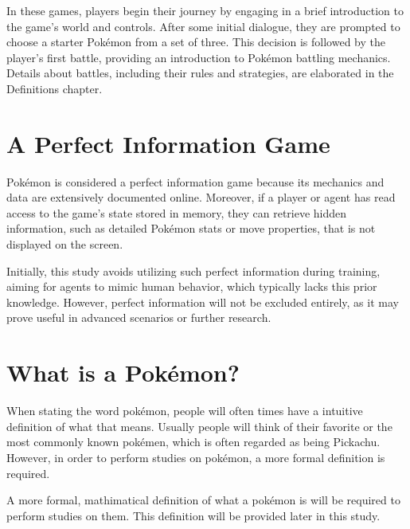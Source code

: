 In these games, players begin their journey by engaging in a brief introduction to the game’s world and controls. After some initial dialogue, they are prompted to choose a starter Pokémon from a set of three. This decision is followed by the player’s first battle, providing an introduction to Pokémon battling mechanics. Details about battles, including their rules and strategies, are elaborated in the Definitions chapter.

\section{A Perfect Information Game}
Pokémon is considered a perfect information game because its mechanics and data are extensively documented online. Moreover, if a player or agent has read access to the game’s state stored in memory, they can retrieve hidden information, such as detailed Pokémon stats or move properties, that is not displayed on the screen.

Initially, this study avoids utilizing such perfect information during training, aiming for agents to mimic human behavior, which typically lacks this prior knowledge. However, perfect information will not be excluded entirely, as it may prove useful in advanced scenarios or further research.

\section{What is a Pokémon?}

When stating the word pokémon, people will often times have a intuitive definition of what that means. Usually people will think of their favorite or the most commonly known pokémen, which is often regarded as being Pickachu. However, in order to perform studies on pokémon, a more formal definition is required.

A more formal, mathimatical definition of what a pokémon is will be required to perform studies on them. This definition will be provided later in this study.